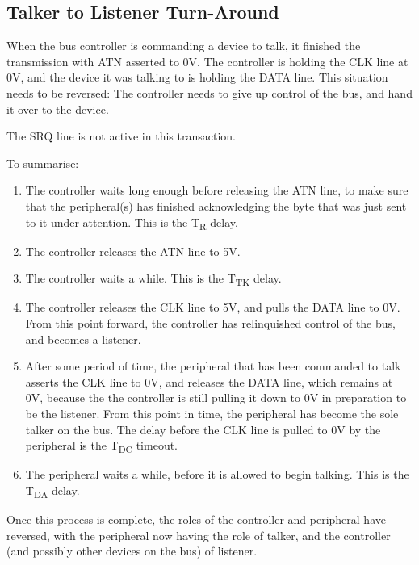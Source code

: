 \subsection{Talker to Listener Turn-Around}

When the bus controller is commanding a device to talk, it finished
the transmission with ATN asserted to 0V.  The controller is holding
the CLK line at 0V, and the device it was talking to is holding the
DATA line.  This situation needs to be reversed: The controller needs
to give up control of the bus, and hand it over to the device.

The SRQ line is not active in this transaction.

To summarise:

\begin{enumerate}
\item The controller waits long enough before releasing the
ATN line, to make sure that the peripheral(s) has finished acknowledging the
byte that was just sent to it under attention. This is the T\textsubscript{R} delay.
\item The controller releases the ATN line to 5V.
\item The controller waits a while. This is the T\textsubscript{TK} delay.
\item The controller releases the CLK line to 5V, and pulls the DATA
  line to 0V. From this point
  forward, the controller has relinquished control of the bus, and
  becomes a listener.
\item After some period of time, the peripheral that has been
  commanded to talk asserts the CLK line to 0V, and releases the DATA
  line, which remains at 0V, because the the controller is still
  pulling it down to 0V in preparation to be the listener.
  From this point
  in time, the peripheral has become the sole talker on the
  bus. The delay before the CLK line is pulled to 0V by the
  peripheral is the T\textsubscript{DC} timeout.
\item The peripheral waits a while, before it is allowed to
  begin talking. This is the T\textsubscript{DA} delay.
\end{enumerate}

Once this process is complete, the roles of the controller and
peripheral have reversed, with the peripheral now having the role of
talker, and the controller (and possibly other devices on the bus) of
listener.


